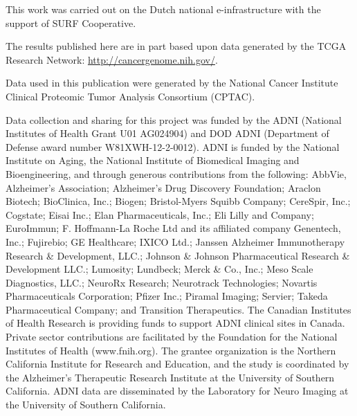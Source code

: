 This work was carried out on the Dutch national e-infrastructure with the support of SURF Cooperative.

The results published here are in part based upon data generated by the TCGA Research Network: \url{http://cancergenome.nih.gov/}.

Data used in this publication were generated by the National Cancer Institute Clinical Proteomic Tumor Analysis Consortium (CPTAC).

Data collection and sharing for this project was funded by the ADNI (National Institutes of Health Grant U01 AG024904) and DOD ADNI (Department of Defense award number W81XWH-12-2-0012).
ADNI is funded by the National Institute on Aging, the National Institute of Biomedical Imaging and Bioengineering, and through generous contributions from the following: AbbVie, Alzheimer's Association; Alzheimer's Drug Discovery Foundation; Araclon Biotech; BioClinica, Inc.; Biogen; Bristol-Myers Squibb Company; CereSpir, Inc.; Cogstate; Eisai Inc.; Elan Pharmaceuticals, Inc.; Eli Lilly and Company; EuroImmun; F. Hoffmann-La Roche Ltd and its affiliated company Genentech, Inc.; Fujirebio; GE Healthcare; IXICO Ltd.; Janssen Alzheimer Immunotherapy Research \& Development, LLC.; Johnson \& Johnson Pharmaceutical Research \& Development LLC.; Lumosity; Lundbeck; Merck \& Co., Inc.; Meso Scale Diagnostics, LLC.; NeuroRx Research; Neurotrack Technologies; Novartis Pharmaceuticals Corporation; Pfizer Inc.; Piramal Imaging; Servier; Takeda Pharmaceutical Company; and Transition Therapeutics. The Canadian Institutes of Health Research is providing funds to support ADNI clinical sites in Canada. Private sector contributions are facilitated by the Foundation for the National Institutes of Health (www.fnih.org). The grantee organization is the Northern California Institute for Research and Education, and the study is coordinated by the Alzheimer's Therapeutic Research Institute at the University of Southern California.
ADNI data are disseminated by the Laboratory for Neuro Imaging at the University of Southern California.



